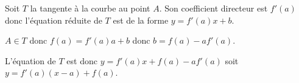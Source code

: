 \documentclass[french]{book}
\newcommand{\ds}{\displaystyle}
\newcommand{\limo}[1][x]{\ds\lim_{#1\rightarrow 0}}
\begin{document}
\begin{demo}
Soit $T$ la tangente à la courbe au point $A$.
Son coefficient directeur est $f'(a)$ donc l'équation réduite de $T$ est de la forme $y=f'(a)x+b$.

$A\in T$ donc $f(a)=f'(a)a+b$ donc $b=f(a)-af'(a)$.

L'équation de $T$ est donc $y=f'(a)x+f(a)-af'(a)$ soit $y=f'(a)(x-a)+f(a)$.
\end{demo}
%
%
%
%
%
\end{document}

